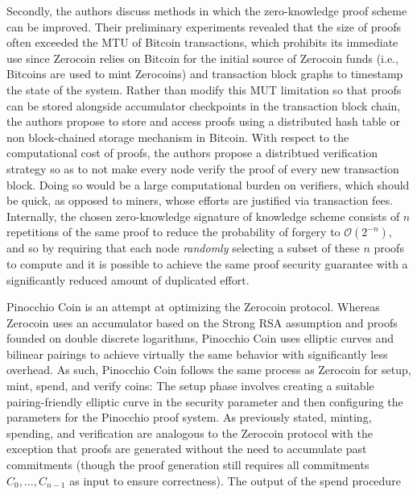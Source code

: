 Secondly, the authors discuss methods in which the zero-knowledge proof scheme can be improved. Their preliminary experiments revealed that the size of proofs often exceeded the MTU of Bitcoin transactions, which prohibits its immediate use since Zerocoin relies on Bitcoin for the initial source of Zerocoin funds (i.e., Bitcoins are used to mint Zerocoins) and transaction block graphs to timestamp the state of the system. Rather than modify this MUT limitation so that proofs can be stored alongside accumulator checkpoints in the transaction block chain, the authors propose to store and access proofs using a distributed hash table or non block-chained storage mechanism in Bitcoin. With respect to the computational cost of proofs, the authors propose a distribtued verification strategy so as to not make every node verify the proof of every new transaction block. Doing so would be a large computational burden on verifiers, which should be quick, as opposed to miners, whose efforts are justified via transaction fees. Internally, the chosen zero-knowledge signature of knowledge scheme consists of $n$ repetitions of the same proof to reduce the probability of forgery to $\mathcal{O}(2^{-n})$, and so by requiring that each node \emph{randomly} selecting a subset of these $n$ proofs to compute and it is possible to achieve the same proof security guarantee with a significantly reduced amount of duplicated effort.


Pinocchio Coin \cite{pinocchio} is an attempt at optimizing the Zerocoin protocol. Whereas Zerocoin uses an accumulator based on the Strong RSA assumption and proofs founded on double discrete logarithms, Pinocchio Coin uses elliptic curves and bilinear pairings to achieve virtually the same behavior with significantly less overhead. As such, Pinocchio Coin follows the same process as Zerocoin for {\sf setup}, {\sf mint}, {\sf spend}, and {\sf verify} coins: The setup phase involves creating a suitable pairing-friendly elliptic curve in the security parameter and then configuring the parameters for the Pinocchio proof system. As previously stated, minting, spending, and verification are analogous to the Zerocoin protocol with the exception that proofs are generated without the need to accumulate past commitments (though the proof generation still requires all commitments $C_0,\dots,C_{n-1}$ as input to ensure correctness). The output of the spend procedure 

